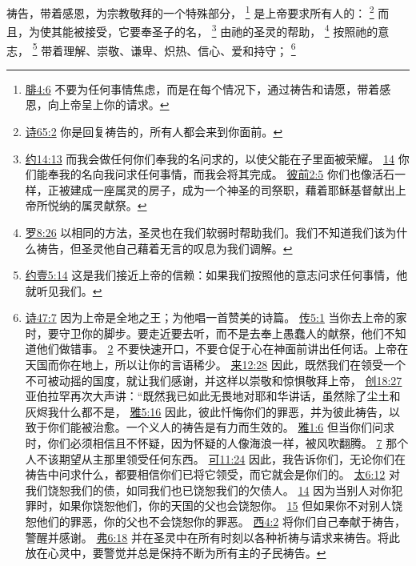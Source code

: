 \documentclass[12pt, a4paper, oneside]{ctexart}
\newcounter{parnum}[section]
\newcommand{\N}{%
   \noindent\refstepcounter{parnum}%
    \makebox[\parindent][l]{\textbf{\arabic{parnum}.}}}
\begin{document}
\N 祷告，带着感恩，为宗教敬拜的一个特殊部分，
	\footnote {
		\href{https://biblehub.com/philippians/4-6.htm}{腓4:6} 不要为任何事情焦虑，而是在每个情况下，通过祷告和请愿，带着感恩，向上帝呈上你的请求。
	}
	是上帝要求所有人的：
	\footnote {
		\href{https://biblehub.com/psalms/65-2.htm}{诗65:2} 你是回复祷告的，所有人都会来到你面前。
	}
	而且，为使其能被接受，它要奉圣子的名，
	\footnote {
		\href{https://biblehub.com/john/14-13.htm}{约14:13} 而我会做任何你们奉我的名问求的，以使父能在子里面被荣耀。
		\href{https://biblehub.com/john/14-14.htm}{14} 你们能奉我的名向我问求任何事情，而我会将其完成。
		\href{https://biblehub.com/1_peter/2-5.htm}{彼前2:5} 你们也像活石一样，正被建成一座属灵的房子，成为一个神圣的司祭职，藉着耶稣基督献出上帝所悦纳的属灵献祭。
	}
	由祂的圣灵的帮助，
	\footnote {
		\href{https://biblehub.com/romans/8-26.htm}{罗8:26} 以相同的方法，圣灵也在我们软弱时帮助我们。我们不知道我们该为什么祷告，但圣灵他自己藉着无言的叹息为我们调解。
	}
	按照祂的意志，
	\footnote {
		\href{https://biblehub.com/1_john/5-14.htm}{约壹5:14} 这是我们接近上帝的信赖：如果我们按照他的意志问求任何事情，他就听见我们。
	}
	带着理解、崇敬、谦卑、炽热、信心、爱和持守；
	\footnote {
		\href{https://biblehub.com/psalms/47-7.htm}{诗47:7} 因为上帝是全地之王；为他唱一首赞美的诗篇。
		\href{https://biblehub.com/ecclesiastes/5-1.htm}{传5:1} 当你去上帝的家时，要守卫你的脚步。要走近要去听，而不是去奉上愚蠢人的献祭，他们不知道他们做错事。
		\href{https://biblehub.com/ecclesiastes/5-2.htm}{2} 不要快速开口，不要仓促于心在神面前讲出任何话。上帝在天国而你在地上，所以让你的言语稀少。
		\href{https://biblehub.com/hebrews/12-28.htm}{来12:28} 因此，既然我们在领受一个不可被动摇的国度，就让我们感谢，并这样以崇敬和惊惧敬拜上帝，
		\href{https://biblehub.com/genesis/18-27.htm}{创18:27} 亚伯拉罕再次大声讲：“既然我已如此无畏地对耶和华讲话，虽然除了尘土和灰烬我什么都不是，
		\href{https://biblehub.com/james/5-16.htm}{雅5:16} 因此，彼此忏悔你们的罪恶，并为彼此祷告，以致于你们能被治愈。一个义人的祷告是有力而生效的。
		\href{https://biblehub.com/james/1-6.htm}{雅1:6} 但当你们问求时，你们必须相信且不怀疑，因为怀疑的人像海浪一样，被风吹翻腾。
		\href{https://biblehub.com/james/1-7.htm}{7} 那个人不该期望从主那里领受任何东西。
		\href{https://biblehub.com/mark/11-24.htm}{可11:24} 因此，我告诉你们，无论你们在祷告中问求什么，都要相信你们已将它领受，而它就会是你们的。
		\href{https://biblehub.com/matthew/6-12.htm}{太6:12} 对我们饶恕我们的债，如同我们也已饶恕我们的欠债人。
		\href{https://biblehub.com/matthew/6-14.htm}{14} 因为当别人对你犯罪时，如果你饶恕他们，你的天国的父也会饶恕你。
		\href{https://biblehub.com/matthew/6-15.htm}{15} 但如果你不对别人饶恕他们的罪恶，你的父也不会饶恕你的罪恶。
		\href{https://biblehub.com/colossians/4-2.htm}{西4:2} 将你们自己奉献于祷告，警醒并感谢。
		\href{https://biblehub.com/ephesians/6-18.htm}{弗6:18} 并在圣灵中在所有时刻以各种祈祷与请求来祷告。将此放在心灵中，要警觉并总是保持不断为所有主的子民祷告。
	}
\end{document}
